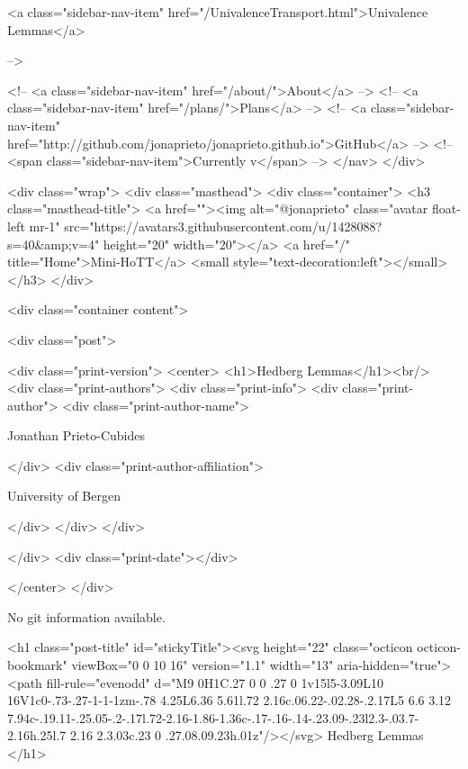       
    
      
        
          <a class="sidebar-nav-item" href="/UnivalenceTransport.html">Univalence Lemmas</a>
        
      
     -->

    <!-- <a class="sidebar-nav-item" href="/about/">About</a> -->
    <!-- <a class="sidebar-nav-item" href="/plans/">Plans</a> -->
    <!-- <a class="sidebar-nav-item" href="http://github.com/jonaprieto/jonaprieto.github.io">GitHub</a> -->
    <!-- <span class="sidebar-nav-item">Currently v</span> -->
  </nav>
</div>

    <div class="wrap">
      <div class="masthead">
        <div class="container">
          <h3 class="masthead-title">
            <a href=""><img alt="@jonaprieto" class="avatar float-left mr-1" src="https://avatars3.githubusercontent.com/u/1428088?s=40&amp;v=4" height="20" width="20"></a>
            <a href="/" title="Home">Mini-HoTT</a>
            <small style="text-decoration:left"></small>
          </h3>
        </div>
      
      <div class="container content">
        







<div class="post">

  <div class="print-version">
    <center>
      <h1>Hedberg Lemmas</h1><br/>
        <div class="print-authors">
          <div class="print-info">
            <div class="print-author">
              <div class="print-author-name">
                
                  Jonathan Prieto-Cubides
                
              </div>
              <div class="print-author-affiliation">
                
                  University of Bergen
                
                </div>
            </div>
          </div>
          
          
        </div>
        <div class="print-date"></div>
        
        
    </center>
  </div>

  
  No git information available.
  
  <h1 class="post-title" id="stickyTitle"><svg height="22" class="octicon octicon-bookmark" viewBox="0 0 10 16" version="1.1" width="13" aria-hidden="true"><path fill-rule="evenodd" d="M9 0H1C.27 0 0 .27 0 1v15l5-3.09L10 16V1c0-.73-.27-1-1-1zm-.78 4.25L6.36 5.61l.72 2.16c.06.22-.02.28-.2.17L5 6.6 3.12 7.94c-.19.11-.25.05-.2-.17l.72-2.16-1.86-1.36c-.17-.16-.14-.23.09-.23l2.3-.03.7-2.16h.25l.7 2.16 2.3.03c.23 0 .27.08.09.23h.01z"/></svg> Hedberg Lemmas
  </h1>

